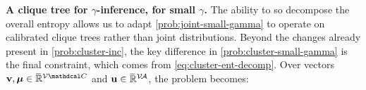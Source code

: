 \documentclass{article}
\begin{document}
\textbf{A clique tree for $\gamma$-inference, for small $\gamma$.}
The ability to so decompose the overall entropy allows us to adapt 
\eqref{prob:joint-small-gamma} to operate on calibrated clique trees 
rather than joint distributions. 
Beyond the changes already present in \eqref{prob:cluster-inc},
the key difference in \eqref{prob:cluster-small-gamma} 
is the final constraint, which comes from
\eqref{eq:cluster-ent-decomp}.
Over vectors
$\mat v, \bmu \in \Rext^{\V\C}$ and
$\mathbf{u} \in \mskip1mu\overline{\mskip-1mu\mathbb R\!}\,^{\mathcal V\!\mathcal A}$,
the problem becomes: 
\end{document}
